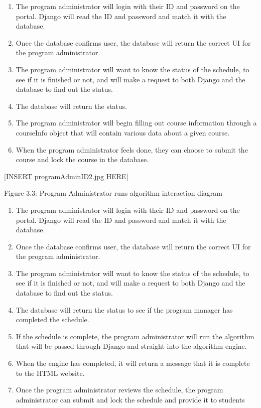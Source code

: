 \documentclass[12pt,article]{memoir}
\begin{document}
\begin{enumerate}
\item The program administrator will login with their ID and password on the portal. Django will read the ID and password and match it with the database. 
\item Once the database confirms user, the database will return the correct UI for the program administrator.
\item The program administrator will want to know the status of the schedule, to see if it is finished or not, and will make a request to both Django and the database to find out the status. 
\item The database will return the status. 
\item The program administrator will begin filling out course information through a courseInfo object that will contain various data about a given course.
\item When the program administrator feels done, they can choose to submit the course and lock the course in the database. 
\end{enumerate}

[INSERT programAdminID2.jpg HERE]

 Figure 3.3: Program Administrator runs algorithm interaction diagram

\begin{enumerate}
\item The program administrator will login with their ID and password on the portal. Django will read the ID and password and match it with the database. 
\item Once the database confirms user, the database will return the correct UI for the program administrator.
\item The program administrator will want to know the status of the schedule, to see if it is finished or not, and will make a request to both Django and the database to find out the status. 
\item The database will return the status to see if the program manager has completed the schedule. 
\item If the schedule is complete, the program administrator will run the algorithm that will be passed through Django and straight into the algorithm engine.
\item When the engine has completed, it will return a message that it is complete to the HTML website. 
\item Once the program administrator reviews the schedule, the program administrator can submit and lock the schedule and provide it to students
\end{enumerate}
\end{document}
